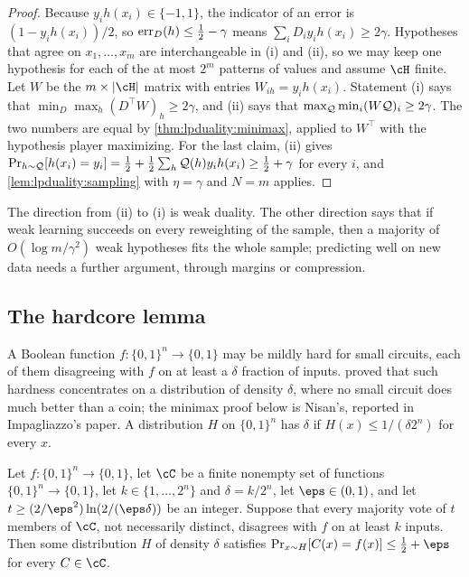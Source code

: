 \begin{refsection}
\begin{proof}
Because $y_ih(x_i)\in\{-1,1\}$, the indicator of an error is $(1-y_ih(x_i))/2$, so $\operatorname{err}_D(h)\le\frac12-\gamma$ means $\sum_iD_iy_ih(x_i)\ge2\gamma$. Hypotheses that agree on $x_1,\dots,x_m$ are interchangeable in (i) and (ii), so we may keep one hypothesis for each of the at most $2^m$ patterns of values and assume $\cH$ finite. Let $W$ be the $m\times|\cH|$ matrix with entries $W_{ih}=y_ih(x_i)$. Statement (i) says that $\min_D\max_h(D^\top W)_h\ge2\gamma$, and (ii) says that $\max_{\mathcal{Q}}\min_i(W\mathcal{Q})_i\ge2\gamma$. The two numbers are equal by \cref{thm:lpduality:minimax}, applied to $W^\top$ with the hypothesis player maximizing. For the last claim, (ii) gives $\Pr_{h\sim\mathcal{Q}}[h(x_i)=y_i]=\frac12+\frac12\sum_h\mathcal{Q}(h)y_ih(x_i)\ge\frac12+\gamma$ for every $i$, and \cref{lem:lpduality:sampling} with $\eta=\gamma$ and $N=m$ applies.
\end{proof}

The direction from (ii) to (i) is weak duality. The other direction says that if weak learning succeeds on every reweighting of the sample, then a majority of $O(\log m/\gamma^2)$ weak hypotheses fits the whole sample; predicting well on new data needs a further argument, through margins or compression.

\subsection{The hardcore lemma}

A Boolean function $f:\{0,1\}^n\to\{0,1\}$ may be mildly hard for small circuits, each of them disagreeing with $f$ on at least a $\delta$ fraction of inputs. \textcite{Impagliazzo1995} proved that such hardness concentrates on a  distribution of density $\delta$, where no small circuit does much better than a coin; the minimax proof below is Nisan's, reported in Impagliazzo's paper. A distribution $H$ on $\{0,1\}^n$ has  $\delta$ if $H(x)\le1/(\delta2^n)$ for every $x$.

\begin{theorem}\label{thm:lpduality:hardcore}
Let $f:\{0,1\}^n\to\{0,1\}$, let $\cC$ be a finite nonempty set of functions $\{0,1\}^n\to\{0,1\}$, let $k\in\{1,\dots,2^n\}$ and $\delta=k/2^n$, let $\eps\in(0,1)$, and let $t\ge(2/\eps^2)\ln(2/(\eps\delta))$ be an integer. Suppose that every majority vote of $t$ members of $\cC$, not necessarily distinct, disagrees with $f$ on at least $k$ inputs. Then some distribution $H$ of density $\delta$ satisfies $\Pr_{x\sim H}[C(x)=f(x)]\le\frac12+\eps$ for every $C\in\cC$.
\end{theorem}


\end{refsection}
